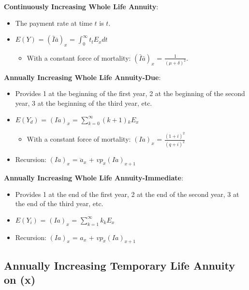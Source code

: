 \documentclass[]{book}
\providecommand{\tightlist}{%
  \setlength{\itemsep}{0pt}\setlength{\parskip}{0pt}}
\begin{document}
\textbf{Continuously Increasing Whole Life Annuity}:

\begin{itemize}
\item
  The payment rate at time \(t\) is \(t\).
\item
  \(E(Y)\) = \((\bar{I}\bar{a})_{x}\) =
  \(\int^{\infty}_0 t{}_{t}E_x dt\)

  \begin{itemize}
  \tightlist
  \item
    With a constant force of mortality: \((\bar{I}\bar{a})_{x}\) =
    \(\frac{1}{(\mu + \delta)^2}\).
  \end{itemize}
\end{itemize}

\textbf{Annually Increasing Whole Life Annuity-Due}:

\begin{itemize}
\item
  Provides 1 at the beginning of the first year, 2 at the beginning of
  the second year, 3 at the beginning of the third year, etc.
\item
  \(E(Y_d)\) = \((I\ddot{a})_{x}\) =
  \(\sum^{\infty}_{k = 0} (k + 1){}_{k}E_x\)

  \begin{itemize}
  \tightlist
  \item
    With a constant force of mortality: \((I\ddot{a})_{x}\) =
    \(\frac{(1 + i)^2}{(q + i)^2}\)
  \end{itemize}
\item
  Recursion: \((I\ddot{a})_x\) = \(\ddot{a}_x\) +
  \(vp_x(I\ddot{a})_{x + 1}\)
\end{itemize}

\textbf{Annually Increasing Whole Life Annuity-Immediate}:

\begin{itemize}
\item
  Provides 1 at the end of the first year, 2 at the end of the second
  year, 3 at the end of the third year, etc.
\item
  \(E(Y_i)\) = \((Ia)_{x}\) = \(\sum^{\infty}_{k = 1} k{}_{k}E_x\)
\item
  Recursion: \((Ia)_x\) = \(a_x\) + \(vp_x(Ia)_{x + 1}\)
\end{itemize}

\subsection{Annually Increasing Temporary Life Annuity on
(x)}\label{annually-increasing-temporary-life-annuity-on-x}
\end{document}
